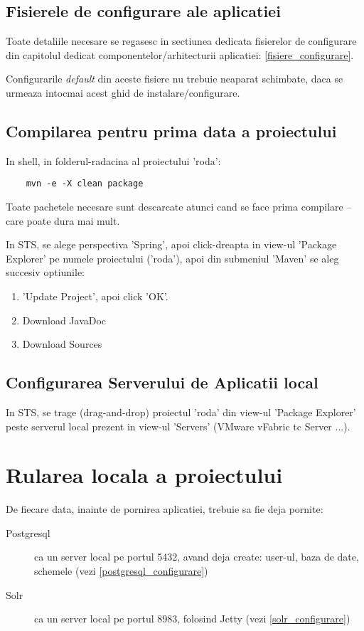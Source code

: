 \subsection{Fisierele de configurare ale aplicatiei}
Toate detaliile necesare se regasesc in sectiunea
dedicata fisierelor de configurare din capitolul dedicat componentelor/arhitecturii aplicatiei: 
\ref{fisiere_configurare}.

Configurarile \emph{default} din aceste fisiere nu trebuie neaparat
schimbate, daca se urmeaza intocmai acest ghid de instalare/configurare.

\subsection{Compilarea pentru prima data a proiectului}

In shell, in folderul-radacina al proiectului 'roda':
\begin{lstlisting}
	mvn -e -X clean package
\end{lstlisting}
Toate pachetele necesare sunt descarcate atunci cand se face prima compilare -- care poate dura mai mult.

In STS, se alege perspectiva 'Spring', 
apoi click-dreapta in view-ul 'Package Explorer' 
pe numele proiectului ('roda'), 
apoi din submeniul 'Maven' se aleg succesiv optiunile:
\begin{enumerate}
\item
'Update Project', apoi click 'OK'.
\item
Download JavaDoc
\item
Download Sources
\end{enumerate}


\subsection{Configurarea Serverului de Aplicatii local}
In STS, se trage (drag-and-drop) proiectul 'roda' din view-ul 'Package Explorer' 
peste serverul local prezent in view-ul 'Servers' (VMware vFabric tc Server ...).

\section{Rularea locala a proiectului}

De fiecare data, inainte de pornirea aplicatiei, trebuie sa fie deja pornite:
\begin{description}
\item[Postgresql] 
ca un server local pe portul 5432, avand deja create: 
user-ul, baza de date, schemele (vezi \ref{postgresql_configurare})
\item[Solr] 
ca un server local pe portul 8983, folosind Jetty (vezi \ref{solr_configurare})
\end{description}


